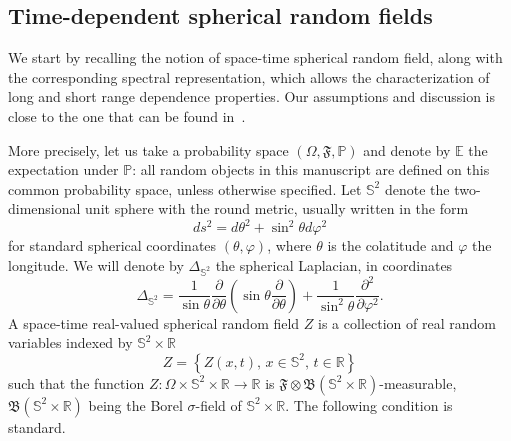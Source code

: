 \documentclass[10pt]{amsart}
\theoremstyle{definition}\newtheorem{defi}[theo]{Definition}\newtheorem{rema}[theo]{Remark}\newtheorem{exam}[theo]{Example}\newtheorem{exem}[theo]{Example}\newtheorem{nota}[theo]{Notation}
\newcommand{\bbS}{\mathbb{S}}
\newcommand{\bbR}{\mathbb{R}}
\newcommand{\bbP}{\mathbb{P}}
\newcommand{\bbE}{\mathbb{E}}
\newcommand{\fkF}{\mathfrak{F}}
\newcommand{\fkB}{\mathfrak{B}}
\begin{document}
\subsection{Time-dependent spherical random fields}

We start by recalling the notion of space-time spherical random field, along with the corresponding spectral representation, which allows the characterization of long and short range dependence properties. Our assumptions and discussion is close to the one that can be found in~\cite {MRV:20}.

More precisely, let us take a probability space $(\Omega,\fkF,
\bbP)$ and denote by $\bbE$ the expectation under $\bbP$: all random objects in this manuscript are defined on this common probability space, unless otherwise specified. Let $\bbS^{2}$ denote the two-dimensional unit sphere with the round metric, usually written in the form
\begin{equation*}
ds^{2}=d\theta ^{2}+\sin ^{2}\theta d\varphi ^{2}
\end{equation*}
for standard spherical coordinates $(\theta,\varphi)$, where $\theta $ is the colatitude and $\varphi $ the longitude. We will denote by $\Delta_{\bbS^2}$ the spherical Laplacian, in coordinates
\begin{equation*}
\Delta_{\bbS^2} = \frac{1}{\sin \theta} \frac{\partial}{\partial \theta} \left (\sin
\theta \frac{\partial}{\partial \theta} \right) + \frac{1}{\sin^2\theta}
\frac{\partial^2}{\partial \varphi^2}.
\end{equation*}
A space-time real-valued spherical random field $Z$ is a collection of real random variables indexed by $\bbS^{2}\times \bbR$
\begin{equation}\label{eq1}
Z=\left\{Z(x,t),\,x\in \bbS^{2},\,t\in \bbR\right\}
\end{equation}
such that the function $Z:\Omega \times \bbS^{2}\times \bbR
\rightarrow \bbR$ is $\fkF\otimes \fkB(\bbS ^{2}\times \bbR)$-measurable, $\fkB(\bbS^{2}\times\bbR)$ being the Borel $\sigma $-field of $\bbS^{2}\times
\bbR$. The following condition is standard.
\end{document}
